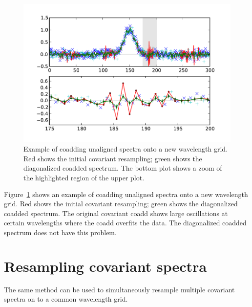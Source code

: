 \documentclass[12pt]{article}
\begin{document}
\begin{figure}[t]
\centering
\includegraphics{plots/coadd_spectra.pdf}
\caption{
Example of coadding unaligned spectra onto a new wavelength grid.
Red shows the initial covariant resampling; green shows the diagonalized
coadded spectrum.  The bottom plot shows a zoom of the highlighted region
of the upper plot.
}
\label{fig:coadd_spectra}
\end{figure}

Figure~\ref{fig:coadd_spectra} shows an example of coadding unaligned spectra
onto a new wavelength grid.
Red shows the initial covariant resampling; green shows the diagonalized
coadded spectrum.  The original covariant coadd shows large oscillations
at certain wavelengths where the coadd overfits the data.  The diagonalized
coadded spectrum does not have this problem.

\section{Resampling covariant spectra}

The same method can be used to simultaneously resample multiple
covariant spectra on to a common wavelength grid.
\end{document}
